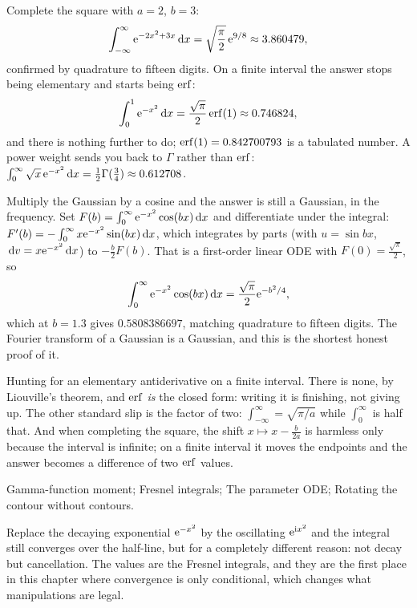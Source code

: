 \begin{worked}
Complete the square with $a=2$, $b=3$:
\[\int_{-\infty}^{\infty}\mathrm{e}^{-2x^{2}+3x}\,\mathrm{d} x=\sqrt{\frac{\pi}{2}}\,\mathrm{e}^{9/8}\approx3.860479,\]
confirmed by quadrature to fifteen digits. On a finite interval the answer stops being elementary and starts being $\operatorname{erf}$:
\[\int_0^1\mathrm{e}^{-x^{2}}\,\mathrm{d} x=\frac{\sqrt\pi}{2}\operatorname{erf}(1)\approx0.746824,\]
and there is nothing further to do; $\operatorname{erf}(1)=0.842700793$ is a tabulated number. A power weight sends you back to $\Gamma$ rather than $\operatorname{erf}$: $\int_0^{\infty}\sqrt x\,\mathrm{e}^{-x^{2}}\,\mathrm{d} x=\tfrac12\Gamma(\tfrac34)\approx0.612708$.
\end{worked}

\begin{worked}
Multiply the Gaussian by a cosine and the answer is still a Gaussian, in the frequency. Set $F(b)=\int_0^{\infty}\mathrm{e}^{-x^{2}}\cos(bx)\,\mathrm{d} x$ and differentiate under the integral: $F'(b)=-\int_0^{\infty}x\mathrm{e}^{-x^{2}}\sin(bx)\,\mathrm{d} x$, which integrates by parts (with $u=\sin bx$, $\,\mathrm{d} v=x\mathrm{e}^{-x^{2}}\,\mathrm{d} x$) to $-\tfrac b2F(b)$. That is a first-order linear ODE with $F(0)=\tfrac{\sqrt\pi}{2}$, so
\[\int_0^{\infty}\mathrm{e}^{-x^{2}}\cos(bx)\,\mathrm{d} x=\frac{\sqrt\pi}{2}\mathrm{e}^{-b^{2}/4},\]
which at $b=1.3$ gives $0.5808386697$, matching quadrature to fifteen digits. The Fourier transform of a Gaussian is a Gaussian, and this is the shortest honest proof of it.
\end{worked}

\begin{trap}
Hunting for an elementary antiderivative on a finite interval. There is none, by Liouville's theorem, and $\operatorname{erf}$ \emph{is} the closed form: writing it is finishing, not giving up. The other standard slip is the factor of two: $\int_{-\infty}^{\infty}=\sqrt{\pi/a}$ while $\int_0^{\infty}$ is half that. And when completing the square, the shift $x\mapsto x-\tfrac{b}{2a}$ is harmless only because the interval is infinite; on a finite interval it moves the endpoints and the answer becomes a difference of two $\operatorname{erf}$ values.
\end{trap}

\begin{seealsob}Gamma-function moment; Fresnel integrals; The parameter ODE; Rotating the contour without contours.\end{seealsob}

Replace the decaying exponential $\mathrm{e}^{-x^{2}}$ by the oscillating $\mathrm{e}^{\mathrm{i} x^{2}}$ and the integral still converges over the half-line, but for a completely different reason: not decay but cancellation. The values are the Fresnel integrals, and they are the first place in this chapter where convergence is only conditional, which changes what manipulations are legal.

